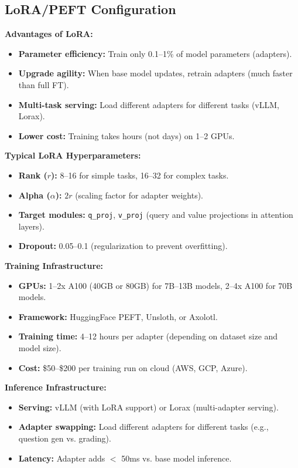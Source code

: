 \documentclass[11pt,letterpaper]{article}
\begin{document}
\subsection{LoRA/PEFT Configuration}

\textbf{Advantages of LoRA:}
\begin{itemize}
\item \textbf{Parameter efficiency:} Train only 0.1--1\% of model parameters (adapters).
\item \textbf{Upgrade agility:} When base model updates, retrain adapters (much faster than full FT).
\item \textbf{Multi-task serving:} Load different adapters for different tasks (vLLM, Lorax).
\item \textbf{Lower cost:} Training takes hours (not days) on 1--2 GPUs.
\end{itemize}

\textbf{Typical LoRA Hyperparameters:}
\begin{itemize}
\item \textbf{Rank ($r$):} 8--16 for simple tasks, 16--32 for complex tasks.
\item \textbf{Alpha ($\alpha$):} $2r$ (scaling factor for adapter weights).
\item \textbf{Target modules:} \texttt{q\_proj}, \texttt{v\_proj} (query and value projections in attention layers).
\item \textbf{Dropout:} 0.05--0.1 (regularization to prevent overfitting).
\end{itemize}

\textbf{Training Infrastructure:}
\begin{itemize}
\item \textbf{GPUs:} 1--2x A100 (40GB or 80GB) for 7B--13B models, 2--4x A100 for 70B models.
\item \textbf{Framework:} HuggingFace PEFT, Unsloth, or Axolotl.
\item \textbf{Training time:} 4--12 hours per adapter (depending on dataset size and model size).
\item \textbf{Cost:} \$50--\$200 per training run on cloud (AWS, GCP, Azure).
\end{itemize}

\textbf{Inference Infrastructure:}
\begin{itemize}
\item \textbf{Serving:} vLLM (with LoRA support) or Lorax (multi-adapter serving).
\item \textbf{Adapter swapping:} Load different adapters for different tasks (e.g., question gen vs. grading).
\item \textbf{Latency:} Adapter adds $<$ 50ms vs. base model inference.
\end{itemize}
\end{document}
